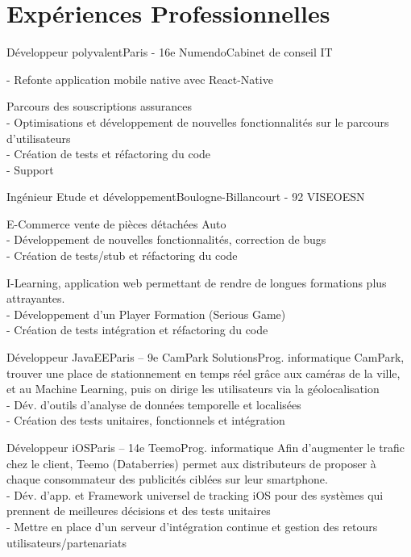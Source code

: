 \section{Expériences Professionnelles}
	\begin{minipage}{\textwidth}
		{Développeur polyvalent}{Paris - 16e}
		{Numendo}{Cabinet de conseil IT}
		{
			{}
			{
				- Refonte application mobile native avec React-Native
			}
		
			{Parcours des souscriptions assurances}
			{
				\\- Optimisations et développement de nouvelles fonctionnalités sur le parcours d'utilisateurs
				\\- Création de tests et réfactoring du code
				\\- Support
			}
		}
	
		{Ingénieur Etude et développement}{Boulogne-Billancourt - 92}
		{VISEO}{ESN}
		{
			{E-Commerce vente de pièces détachées Auto}
			{
				\\- Développement de nouvelles fonctionnalités, correction de bugs
				\\- Création de tests/stub et réfactoring du code
			}

			{I-Learning, application web permettant de rendre  de longues formations plus attrayantes.}
			{
				\\- Développement d'un Player Formation (Serious Game)
				\\- Création de tests intégration et réfactoring du code
			}
		}

		{Développeur JavaEE}{Paris – 9e}
		{CamPark Solutions}{Prog. informatique}
		{
			{CamPark, trouver une place de stationnement en temps réel grâce aux caméras de la ville, et au Machine Learning, puis on dirige les utilisateurs via la géolocalisation}
			{
				\\- Dév. d’outils d’analyse de données temporelle et localisées
				\\- Création des tests unitaires, fonctionnels et intégration
			}
		}
	
		{Développeur iOS}{Paris – 14e}
		{Teemo}{Prog. informatique}
		{
			{Afin d’augmenter le trafic chez le client, Teemo (Databerries) permet aux distributeurs de proposer à chaque consommateur des publicités ciblées sur leur smartphone.}
			{
				\\- Dév. d'app. et Framework universel de tracking iOS pour des systèmes qui prennent de meilleures décisions et des tests unitaires
				\\- Mettre en place d'un serveur d'intégration continue et gestion des retours utilisateurs/partenariats
			}
		}
	\end{minipage}